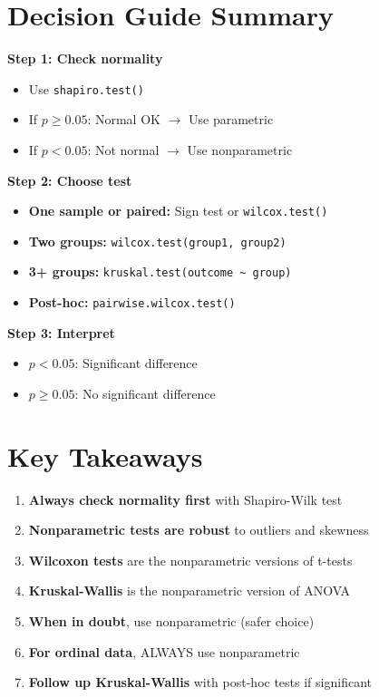 \documentclass[11pt]{article}
\begin{document}
\vspace{1cm}

\section{Decision Guide Summary}

\textbf{Step 1: Check normality}
\begin{itemize}
\item Use \texttt{shapiro.test()}
\item If $p \geq 0.05$: Normal OK $\rightarrow$ Use parametric
\item If $p < 0.05$: Not normal $\rightarrow$ Use nonparametric
\end{itemize}

\textbf{Step 2: Choose test}
\begin{itemize}
\item \textbf{One sample or paired:} Sign test or \texttt{wilcox.test()}
\item \textbf{Two groups:} \texttt{wilcox.test(group1, group2)}
\item \textbf{3+ groups:} \texttt{kruskal.test(outcome \textasciitilde{} group)}
\item \textbf{Post-hoc:} \texttt{pairwise.wilcox.test()}
\end{itemize}

\textbf{Step 3: Interpret}
\begin{itemize}
\item $p < 0.05$: Significant difference
\item $p \geq 0.05$: No significant difference
\end{itemize}

\section{Key Takeaways}

\begin{enumerate}
\item \textbf{Always check normality first} with Shapiro-Wilk test
\item \textbf{Nonparametric tests are robust} to outliers and skewness
\item \textbf{Wilcoxon tests} are the nonparametric versions of t-tests
\item \textbf{Kruskal-Wallis} is the nonparametric version of ANOVA
\item \textbf{When in doubt}, use nonparametric (safer choice)
\item \textbf{For ordinal data}, ALWAYS use nonparametric
\item \textbf{Follow up Kruskal-Wallis} with post-hoc tests if significant
\end{enumerate}
\end{document}
